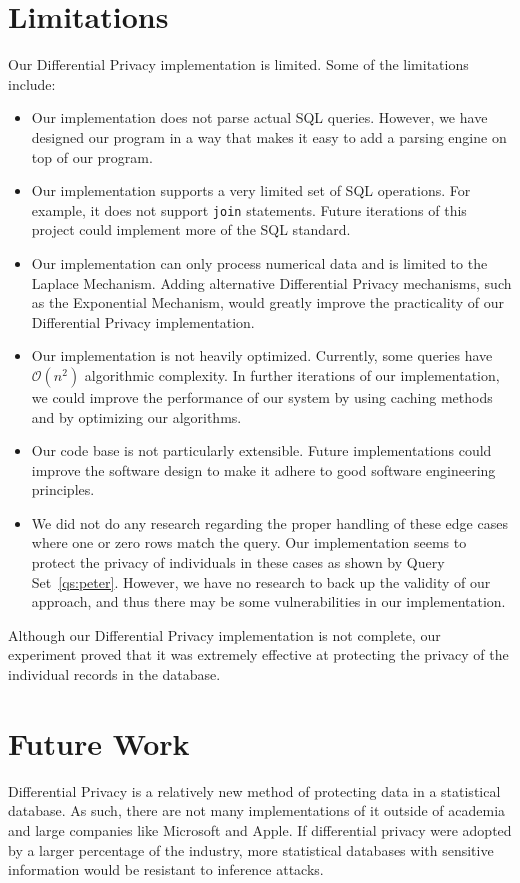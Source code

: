 \documentclass[conference,11pt]{IEEEtran}
\begin{document}
\section{Limitations}\label{sec:limitations}
Our Differential Privacy implementation is limited. Some of the limitations
include:
\begin{itemize}
    \item Our implementation does not parse actual SQL queries. However, we
        have designed our program in a way that makes it easy to add a parsing
        engine on top of our program.
    \item Our implementation supports a very limited set of SQL operations. For
        example, it does not support \texttt{join} statements.  Future
        iterations of this project could implement more of the SQL standard.
    \item Our implementation can only process numerical data and is limited to
        the Laplace Mechanism. Adding alternative Differential Privacy mechanisms,
        such as the Exponential Mechanism, would greatly improve the practicality
        of our Differential Privacy implementation.
    \item Our implementation is not heavily optimized. Currently, some queries
        have $\mathcal{O}(n^2)$ algorithmic complexity. In further iterations of
        our implementation, we could improve the performance of our system by using
        caching methods and by optimizing our algorithms.
    \item Our code base is not particularly extensible. Future implementations
        could improve the software design to make it adhere to good software
        engineering principles.
    \item We did not do any research regarding the proper handling of these edge
        cases where one or zero rows match the query. Our implementation seems
        to protect the privacy of individuals in these cases as shown by Query
        Set~\ref{qs:peter}. However, we have no research to back up the validity
        of our approach, and thus there may be some vulnerabilities in our
        implementation.
\end{itemize}

Although our Differential Privacy implementation is not complete, our experiment
proved that it was extremely effective at protecting the privacy of the
individual records in the database.

\section{Future Work}\label{sec:future-work}
Differential Privacy is a relatively new method of protecting data in a
statistical database. As such, there are not many implementations of it outside
of academia and large companies like Microsoft and Apple. If differential
privacy were adopted by a larger percentage of the industry, more statistical
databases with sensitive information would be resistant to inference attacks.
\end{document}
